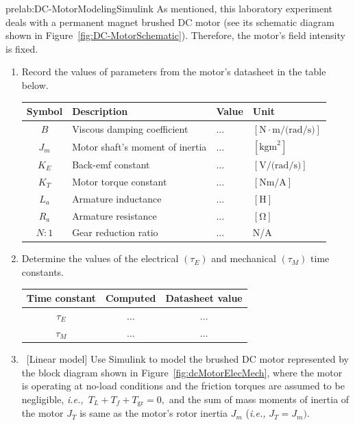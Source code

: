 \begin{prelab}{prelab:DC-MotorModelingSimulink}
As mentioned, this laboratory experiment deals with a permanent magnet brushed DC motor (see its schematic diagram shown in Figure~\ref{fig:DC-MotorSchematic}). Therefore, the motor's field intensity is fixed. 
%
\begin{enumerate}
\item Record the values of parameters from the motor's datasheet in the table below.

  \begin{center}
    \begin{tabular}{c|l|l|l}
      \toprule
      Symbol & Description & Value & Unit\\
      \toprule
      $B$&Viscous damping coefficient&$\ldots$&$[\si{\newton\cdot\meter\per(\radian\per\second)}]$\\
      $J_m$&Motor shaft's moment of inertia&$\ldots$&$[\si{\kilogram\meter}^2]$\\      
      $K_E$&Back-emf constant &$\ldots$&$[\si{\volt\per(\radian\per\second)}]$\\
      $K_T$&Motor torque constant &$\ldots$&$[\si{\newton\meter\per\ampere}]$\\
      $L_a$&Armature inductance &$\ldots$&$[\si{\henry}]$\\            
      $R_a$&Armature resistance &$\ldots$&$[\si{\ohm}]$\\
      $N:1$&Gear reduction ratio &$\ldots$&N/A\\      
      \bottomrule
    \end{tabular}    
  \end{center}
\item Determine the values of the electrical $(\tau_E)$ and mechanical $(\tau_M)$ time constants.
%
  \begin{center}
    \begin{tabular}{c|c|c}
      \toprule
      Time constant &  Computed & Datasheet value\\
      \toprule
      $\tau_E$ & $\ldots$ & $\ldots$\\
      $\tau_M$ & $\ldots$ & $\ldots$\\
      \bottomrule
    \end{tabular}    
  \end{center}
\item  ~[Linear model] Use Simulink to model the brushed DC motor represented by the block diagram shown in Figure~\ref{fig:dcMotorElecMech}, where the motor is operating at no-load conditions and the friction torques are assumed to be negligible, \textit{i.e.,~}$T_L + T_f +T_{\mathrm{gr}} = 0,$ and the sum of mass moments of inertia of the motor $J_T$ is same as the motor's rotor inertia $J_m$ (\textit{i.e.,} $J_T=J_m).$

\end{enumerate}
\end{prelab}
